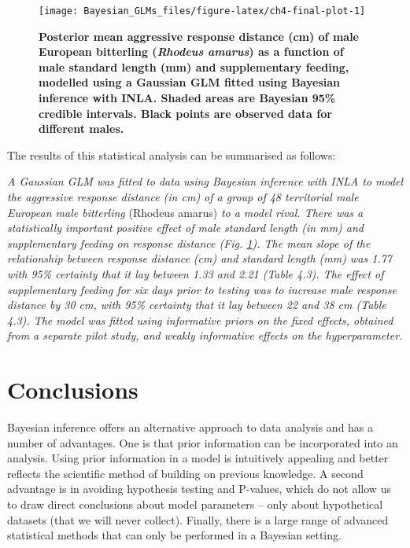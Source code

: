\documentclass[
]{book}
\begin{document}
\begin{figure}

{\centering \texttt{[image: Bayesian\_GLMs\_files/figure-latex/ch4-final-plot-1]} 

}

\caption{\textbf{Posterior mean aggressive response distance (cm) of male European bitterling (\emph{Rhodeus amarus}) as a function of male standard length (mm) and supplementary feeding, modelled using a Gaussian GLM fitted using Bayesian inference with INLA. Shaded areas are Bayesian 95\% credible intervals. Black points are observed data for different males.}}\label{fig:ch4-final-plot}
\end{figure}

The results of this statistical analysis can be summarised as follows:

\emph{A Gaussian GLM was fitted to data using Bayesian inference with INLA to model the aggressive response distance (in cm) of a group of 48 territorial male European male bitterling} (Rhodeus amarus) \emph{to a model rival. There was a statistically important positive effect of male standard length (in mm) and supplementary feeding on response distance (Fig. \ref{fig:ch4-final-plot}). The mean slope of the relationship between response distance (cm) and standard length (mm) was 1.77 with 95\% certainty that it lay between 1.33 and 2.21 (Table 4.3). The effect of supplementary feeding for six days prior to testing was to increase male response distance by 30 cm, with 95\% certainty that it lay between 22 and 38 cm (Table 4.3). The model was fitted using informative priors on the fixed effects, obtained from a separate pilot study, and weakly informative effects on the hyperparameter.}

\hypertarget{conclusions-1}{%
\section{Conclusions}\label{conclusions-1}}

Bayesian inference offers an alternative approach to data analysis and has a number of advantages. One is that prior information can be incorporated into an analysis. Using prior information in a model is intuitively appealing and better reflects the scientific method of building on previous knowledge. A second advantage is in avoiding hypothesis testing and P-values, which do not allow us to draw direct conclusions about model parameters -- only about hypothetical datasets (that we will never collect). Finally, there is a large range of advanced statistical methods that can only be performed in a Bayesian setting.
\end{document}
